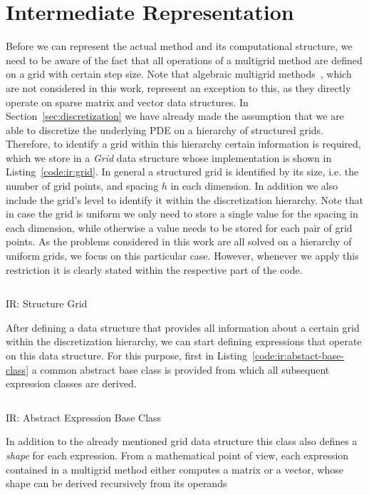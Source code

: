 \section{Intermediate Representation}
\label{sec:intermediate-representation}
Before we can represent the actual method and its computational structure, we need to be aware of the fact that all operations of a multigrid method are defined on a grid with certain step size.
Note that algebraic multigrid methods~\cite{stuben2001introduction,ruge1987algebraic}, which are not considered in this work, represent an exception to this, as they directly operate on sparse matrix and vector data structures.
In Section~\ref{sec:discretization} we have already made the assumption that we are able to discretize the underlying PDE on a hierarchy of structured grids.
Therefore, to identify a grid within this hierarchy certain information is required, which we store in a \emph{Grid} data structure whose implementation is shown in Listing~\ref{code:ir:grid}.
In general a structured grid is identified by its size, i.e. the number of grid points, and spacing $h$ in each dimension.
In addition we also include the grid's level to identify it within the discretization hierarchy.
Note that in case the grid is uniform we only need to store a single value for the spacing in each dimension, while otherwise a value needs to be stored for each pair of grid points.
As the problems considered in this work are all solved on a hierarchy of uniform grids, we focus on this particular case.
However, whenever we apply this restriction it is clearly stated within the respective part of the code.  
\begin{listing}
	\inputminted{python}{evostencils/ir/grid.py}
	\caption{IR: Structure Grid}
	\label{code:ir:grid}
\end{listing}
After defining a data structure that provides all information about a certain grid within the discretization hierarchy, we can start defining expressions that operate on this data structure.
For this purpose, first in Listing~\ref{code:ir:abstact-base-class} a common abstract base class is provided from which all subsequent expression classes are derived.
\begin{listing}
	\inputminted{python}{evostencils/ir/expression.py}
	\caption{IR: Abstract Expression Base Class}
	\label{code:ir:abstact-base-class}
\end{listing}
In addition to the already mentioned grid data structure this class also defines a \emph{shape} for each expression.
From a mathematical point of view, each expression contained in a multigrid method either computes a matrix or a vector, whose shape can be derived recursively from its operands
